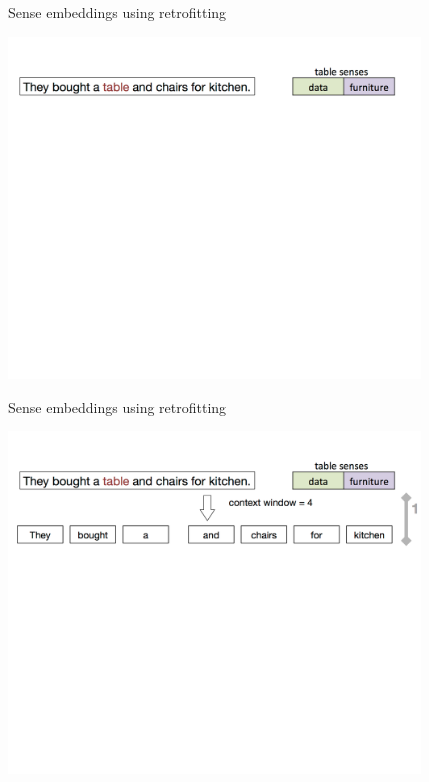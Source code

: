 \documentclass{beamer}
\begin{document}
\begin{frame}{Sense embeddings using retrofitting}
\vspace{-3em}
\begin{center}
\includegraphics[width=0.82\textwidth]{wsd-1}
\end{center}	
\end{frame}



\begin{frame}{Sense embeddings using retrofitting}
\vspace{-3em}
\begin{center}
\includegraphics[width=0.82\textwidth]{wsd-2}
\end{center}	
\end{frame}
\end{document}
